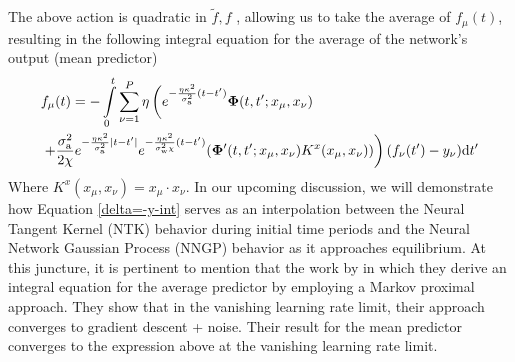 The above action is quadratic in $\tilde{f},f$ , allowing us to take the average of $f_\mu(t)$, resulting in the following integral equation for the average of the network's output (mean predictor)
\begin{align} \label{delta=-y-int}
  &f_{\mu}(t)=-\int\limits_0^t \sum\limits_{\nu=1}^{P} \eta\left(  e^{-\frac{\eta\kappa^2}{\sigma_{\rm a}^2}(t-t')}\bm{\Phi}(t,t';x_\mu,x_\nu)\right. \\ \nonumber
  &\left.+ \frac{\sigma_{\rm a}^2}{2\chi}e^{-\frac{\eta\kappa^2}{\sigma_{\rm a}^2}|t-t'|}e^{-\frac{\eta\kappa^2}{\sigma_{\rm w}^2\chi}(t-t')} (\bm{\Phi}'(t,t';x_\mu,x_\nu)  K^x({x_\mu,x_\nu}))\right)
  (f_{\nu}(t')-y_\nu) \text{d} t' 
\end{align}
Where $K^x(x_\mu, x_\nu)=x_\mu\cdot x_\nu$.
In our upcoming discussion, we will demonstrate how Equation \ref{delta=-y-int} serves as an interpolation between the Neural Tangent Kernel (NTK) behavior during initial time periods and the Neural Network Gaussian Process (NNGP) behavior as it approaches equilibrium. At this juncture, it is pertinent to mention that the work by \cite{avidan2023connectingntknngpunified} in which they derive an integral equation for the average predictor by employing a Markov proximal approach.
They show that in the vanishing learning rate limit, their approach converges to gradient descent + noise. Their result for the mean predictor converges to the expression above at the vanishing learning rate limit.
\clearpage
